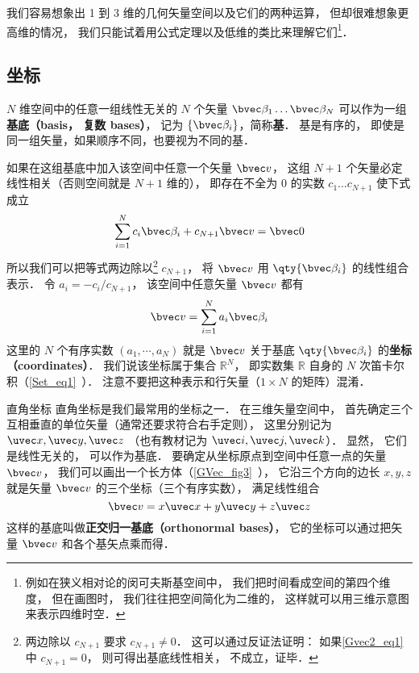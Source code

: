 我们容易想象出 1 到 3 维的几何矢量空间以及它们的两种运算， 但却很难想象更高维的情况， 我们只能试着用公式定理以及低维的类比来理解它们\footnote{例如在狭义相对论的闵可夫斯基空间中， 我们把时间看成空间的第四个维度， 但在画图时， 我们往往把空间简化为二维的， 这样就可以用三维示意图来表示四维时空．}．

\subsection{坐标}
$N$ 维空间中的任意一组线性无关的 $N$ 个矢量 $\bvec \beta_1\dots \bvec \beta_N$ 可以作为一组\textbf{基底（basis， 复数 bases）}， 记为 $\{\bvec \beta_i\}$，简称\textbf{基}． 基是有序的， 即使是同一组矢量，如果顺序不同，也要视为不同的基．

如果在这组基底中加入该空间中任意一个矢量 $\bvec v$， 这组 $N+1$ 个矢量必定线性相关（否则空间就是 $N+1$ 维的）， 即存在不全为 0 的实数 $c_1\dots c_{N+1}$ 使下式成立
\begin{equation}\label{Gvec2_eq1}
\sum_{i=1}^{N} c_i \bvec \beta_i + c_{N+1} \bvec v = \bvec 0
\end{equation}
所以我们可以把等式两边除以\footnote{两边除以 $c_{N+1}$ 要求 $c_{N+1} \ne 0$． 这可以通过反证法证明： 如果\autoref{Gvec2_eq1} 中 $c_{N+1} = 0$， 则可得出基底线性相关， 不成立，证毕．} $c_{N+1}$， 将 $\bvec v$ 用 $\qty{\bvec \beta_i}$ 的线性组合表示． 令 $a_i = -c_i/c_{N+1}$， 该空间中任意矢量 $\bvec v$ 都有
\begin{equation}\label{Gvec2_eq5}
\bvec v = \sum_{i=1}^N a_i \bvec \beta_i
\end{equation}
这里的 $N$ 个有序实数 $(a_1, \cdots, a_N)$ 就是 $\bvec v$ 关于基底 $\qty{\bvec \beta_i}$ 的\textbf{坐标（coordinates）}． 我们说该坐标属于集合 $\mathbb R^N$， 即实数集 $\mathbb R$ 自身的 $N$ 次笛卡尔积（\autoref{Set_eq1}~）． 注意不要把这种表示和行矢量（$1\times N$ 的矩阵）混淆．

\begin{example}{直角坐标}
直角坐标是我们最常用的坐标之一． 在三维矢量空间中， 首先确定三个互相垂直的单位矢量（通常还要求符合右手定则）， 这里分别记为 $\uvec x, \uvec y, \uvec z$ （也有教材记为 $\uvec i, \uvec j, \uvec k$）． 显然， 它们是线性无关的， 可以作为基底． 要确定从坐标原点到空间中任意一点的矢量 $\bvec v$， 我们可以画出一个长方体（\autoref{GVec_fig3}~）， 它沿三个方向的边长 $x, y, z$ 就是矢量 $\bvec v$ 的三个坐标（三个有序实数）， 满足线性组合
\begin{equation}\label{Gvec2_eq4}
\bvec v = x\uvec x + y\uvec y + z\uvec z
\end{equation}
这样的基底叫做\textbf{正交归一基底（orthonormal bases）}， 它的坐标可以通过把矢量 $\bvec v$ 和各个基矢点乘而得．
\end{example}

